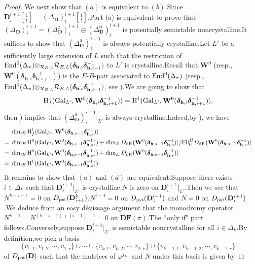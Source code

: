 \documentclass[SecEq,CM,GP]{degruyter-crelle} %
\theoremstyle{plain}
\newcommand{\df}{{\mathbf{DF}}}
\newcommand{\dr}{{\rm dR}}
\newcommand{\Dpik}{{\mathbf{D}}}
\newcommand{\EndO}{{\rm End}}
\newcommand{\fil}{{\rm Fil}}
\newcommand{\gal}{{\rm Gal}}
\newcommand{\hH}{{\mathrm{H}}}
\newcommand{\padelc}{{(\Delta_{\Dpik}^z)}}
\newcommand{\padel}{{(\Delta_{\Dpik}^0)}}
\newcommand{\pst}{{\rm pst}}
\newcommand{\tee}{{{\otimes}_{\cR_{E,L}}}}
\newcommand{\bW}{{\mathbf{W}}}
\newcommand{\bh}{{\mathbf{h}}}
\newcommand{\cR}{\mathcal R}
\begin{document}
\begin{proof}
We next show that $(a)$ is equivalent to $(b)$.\;Since 	$\Dpik_{i}^{i+1}[\frac{1}{t}]=(\Delta_\Dpik)^{i+1}_{i}[\frac{1}{t}]$,\;Part (a) is equivalent to prove that $(\Delta_\Dpik)^{i+1}_{i}=\padelc^{i+1}_{i}\oplus \padel^{i+1}_{i}$ is potentially semistable noncrystalline.\;It suffices to show that $\padel^{i+1}_{i}$ is always potentially crystalline.\;Let $L'$ be a sufficiently large extension of $L$ such that the restriction of $\EndO^0({\Delta_\pi})\tee\cR_{E,L}(\bm{\delta}_{\bh,i}\bm{\delta}_{\bh,i+1}^{-1})$ to $L'$ is crystalline.\;Recall that $\bW^0$ (resp.,\; $\bW^0(\bm{\delta}_{\bh,i}\bm{\delta}_{\bh,i+1}^{-1})$) is the $E$-$B$-pair associated to $\EndO^0({\Delta_\pi})$ (resp.,\;$\EndO^0({\Delta_\pi})\tee\cR_{E,L}(\bm{\delta}_{\bh,i}\bm{\delta}_{\bh,i+1}^{-1})$, see \cite[Theorem 1.36]{nakamura2009classification}).\;We are going to show that \[\hH^1_{f}(\gal_{L'},\bW^0(\bm{\delta}_{\bh,i}\bm{\delta}_{\bh,i+1}^{-1}))=\hH^1(\gal_{L'},\bW^0(\bm{\delta}_{\bh,i}\bm{\delta}_{\bh,i+1}^{-1})),\] then \cite[Remark 2.5]{nakamura2009classification}) implies that  $\padel^{i+1}_{i}|_{L'}$ is always crystalline.\;Indeed,\;by \cite[Proposition 2.7]{nakamura2009classification}), we have
\begin{equation*}
	\begin{aligned}
		&\dim_E\hH^1_f(\gal_{L'},\bW^0(\bm{\delta}_{\bh,s-1}\bm{\delta}_{\bh,s}^{-1}))\\
		=\;&\dim_E\hH^0(\gal_{L'},\bW^0(\bm{\delta}_{\bh,s-1}\bm{\delta}_{\bh,s}^{-1}))+\dim_ED_{\dr}(\bW^0(\bm{\delta}_{\bh,s-1}\bm{\delta}_{\bh,s}^{-1}))/\fil^H_0D_{\dr}(\bW^0(\bm{\delta}_{\bh,s-1}\bm{\delta}_{\bh,s}^{-1}))\\
		=\;&\dim_E\hH^0(\gal_{L'},\bW^0(\bm{\delta}_{\bh,s-1}\bm{\delta}_{\bh,s}^{-1}))+\dim_ED_{\dr}(\bW^0(\bm{\delta}_{\bh,s-1}\bm{\delta}_{\bh,s}^{-1}))\\
		=\;&\dim_E\hH^1(\gal_{L'},\bW^0(\bm{\delta}_{\bh,s-1}\bm{\delta}_{\bh,s}^{-1})).\;
	\end{aligned}
\end{equation*}
It remains to show that $(a)$ and $(d)$ are equivalent.\;Suppose there exists $i\in \Delta_k$ such that $\Dpik^{i+1}_i|_{L'}$ is crystalline.\;$N$ is zero on $\Dpik^{i+1}_i|_{L'}$.\;Then we see that $N^{k-i-1}=0$ on $D_{\pst}(\Dpik^{k}_{i+1})$,\;$N^{i-1}=0$ on $D_{\pst}(\Dpik^{i-1}_{1})$ and $N=0$ on $D_{\pst}(\Dpik^{i+1}_{i})$.\;We deduce from an easy d\'evissage argument that the monodromy operator $N^{k-1}=N^{(k-i-1)+(i-1)+1}=0$ on $\df(\pi)$.\;The ``only if" part follows.\;Conversely,\;suppose $\Dpik^{i+1}_i|_{L'}$ is semistable noncrystalline for all $i\in \Delta_k$.\;By definition,\;we pick a basis \[\{v_{1,1},v_{1,2},\cdots,v_{1,r}\}\cup\cdots \cup\{v_{k,1},v_{k,2},\cdots,v_{k,r}\}\cup \{v_{k-1,1},v_{k-1,2},\cdots,v_{k-1,r}\}\] of $D_{\pst}(\Dpik)$ such that the matrices of  $\varphi^{f_L'}$ and $N$  under this basis is given by

\end{proof}
\end{document}
